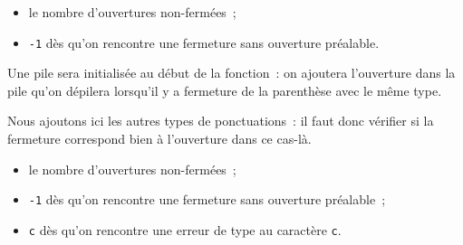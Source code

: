 \begin{itemize}
	\item le nombre d'ouvertures non-fermées~;
	\item \texttt{-1} dès qu'on rencontre une fermeture sans ouverture préalable.
\end{itemize}
Une pile sera initialisée au début de la fonction~: on ajoutera l'ouverture dans la pile qu'on dépilera lorsqu'il y a fermeture de la parenthèse avec le même type.


Nous ajoutons ici les autres types de ponctuations~: il faut donc vérifier si la fermeture correspond bien à l'ouverture dans ce cas-là. 

\begin{itemize}
	\item le nombre d'ouvertures non-fermées~; 
	\item \texttt{-1} dès qu'on rencontre une fermeture sans ouverture préalable~; 
	\item \texttt{c} dès qu'on rencontre une erreur de type au caractère \texttt{c}.
\end{itemize}

\question{Tester la fonction avec \texttt{"\{[()\}"}, \texttt{"\{[()]"} et \texttt{"\{[()]\}"}.}
